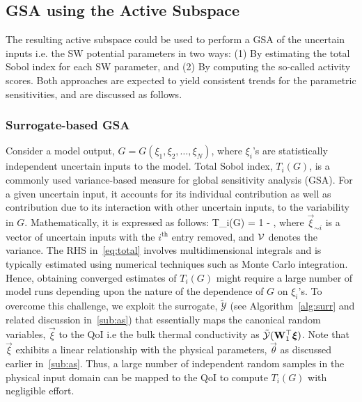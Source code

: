 \subsection{GSA using the Active Subspace}
\label{sub:scores} 

The resulting active subspace could be used to perform a GSA of the uncertain inputs i.e. the SW potential
parameters in two ways: (1) By estimating the total Sobol index for each SW parameter, and (2) By computing
the so-called activity scores. Both approaches are expected to yield consistent trends for the parametric 
sensitivities, and are discussed as follows. 

\subsubsection{Surrogate-based GSA}
\label{subsub:gsa_surr}

Consider a model output, $G= G(\xi_1,\xi_2,\ldots,\xi_N)$, where $\xi_i$'s are statistically independent uncertain
inputs to the model. Total Sobol index, $T_i(G)$, is a commonly used variance-based measure for global sensitivity 
analysis (GSA). For a given uncertain input, it accounts for its individual contribution as well as contribution due to
its interaction with other uncertain inputs, to the variability in $G$. Mathematically, it is expressed as follows:
%
\be
T_i(G) = 1 - 
,
\label{eq:total}
\ee
%
where $\vec{\xi}_{\sim i}$ is a vector of uncertain inputs with the  $i^\text{th}$ entry removed, and $\mathcal{V}$ denotes the 
variance. The RHS in~\eqref{eq:total} involves multidimensional integrals and is typically estimated using numerical
techniques such as Monte Carlo integration. Hence, obtaining converged estimates of $T_i(G)$ might require a large 
number of model runs depending upon the nature of the dependence of $G$ on $\xi_i$'s. To overcome this challenge,
we exploit the surrogate, $\tilde{\mathcal{Y}}$ (see Algorithm~\ref{alg:surr} and related discussion in~\ref{sub:as})
that essentially maps the canonical random variables, $\vec{\xi}$ to the QoI i.e the bulk thermal conductivity as 
$\tilde{\mathcal{Y}}(\mat{W}_1^\top\vec{\xi})$. Note that $\vec{\xi}$ exhibits a linear
relationship with the physical parameters, $\vec{\theta}$ as discussed earlier in~\ref{sub:as}.
Thus, a large number of
independent random samples in the physical input domain can be mapped to the QoI to compute $T_i(G)$
with negligible effort. 

